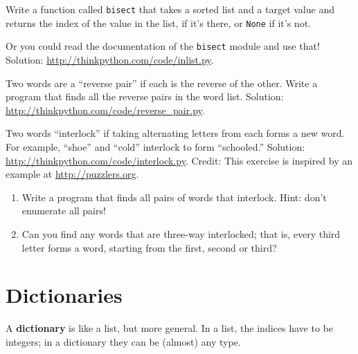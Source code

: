 \documentclass[10pt]{book}
\begin{document}
\begin{CJK}{UTF8}{gbsn}
\begin{exercise}
Write a function called {\tt bisect} that takes a sorted list
and a target value and returns the index of the value
in the list, if it's there, or {\tt None} if it's not.

Or you could read the documentation of the {\tt bisect} module
and use that!  Solution: \url{http://thinkpython.com/code/inlist.py}.

\end{exercise}

\begin{exercise}

Two words are a ``reverse pair'' if each is the reverse of the
other.  Write a program that finds all the reverse pairs in the
word list.  Solution: \url{http://thinkpython.com/code/reverse_pair.py}.

\end{exercise}

\begin{exercise}

Two words ``interlock'' if taking alternating letters from each forms
a new word.  For example, ``shoe'' and ``cold''
interlock to form ``schooled.''
Solution: \url{http://thinkpython.com/code/interlock.py}.
Credit: This exercise is inspired by an example at \url{http://puzzlers.org}.

\begin{enumerate}

\item Write a program that finds all pairs of words that interlock.
  Hint: don't enumerate all pairs!

\item Can you find any words that are three-way interlocked; that is,
  every third letter forms a word, starting from the first, second or
  third?

\end{enumerate}
\end{exercise}


\chapter{Dictionaries}

A {\bf dictionary} is like a list, but more general.  In a list,
the indices have to be integers; in a dictionary they can
be (almost) any type.


\end{CJK}
\end{document}
